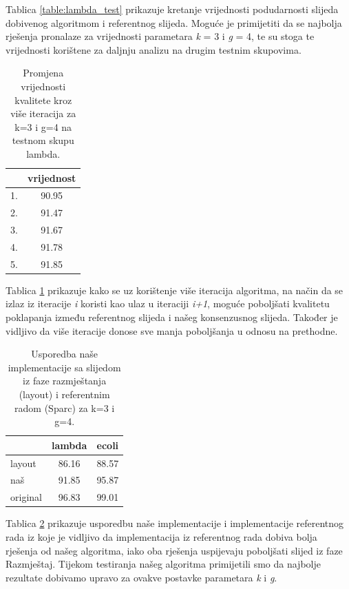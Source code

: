\documentclass[times, utf8, seminar, numeric]{fer}
\begin{document}
Tablica \ref{table:lambda_test} prikazuje kretanje vrijednosti podudarnosti slijeda dobivenog algoritmom i referentnog slijeda. Moguće je primijetiti da se najbolja rješenja pronalaze za vrijednosti parametara \emph{k} = 3 i \emph{g} = 4, te su stoga te vrijednosti korištene za daljnju analizu na drugim testnim skupovima.

\begin{table}[htb]
	\centering
	\begin{tabular}{l|c}
		& \multicolumn{1}{l}{vrijednost}\\ 	\hline
		1. 					& 90.95 	\\ 	\hline
		2.  				& 91.47 	\\	\hline
		3.		   			& 91.67		\\ 	\hline
		4.		   			& 91.78		\\ 	\hline
		5.		   			& 91.85		\\ 	\hline
	\end{tabular}
	\caption{Promjena vrijednosti kvalitete kroz više iteracija za k=3 i g=4 na testnom skupu lambda.}
	\label{table:iteracije}
\end{table}


Tablica \ref{table:iteracije} prikazuje kako se uz korištenje više iteracija algoritma, na način da se izlaz iz iteracije \emph{i} koristi kao ulaz u iteraciji \emph{i+1}, moguće poboljšati kvalitetu poklapanja između referentnog slijeda i našeg konsenzusnog slijeda. Također je vidljivo da više iteracije donose sve manja poboljšanja u odnosu na prethodne.

\begin{table}[htb]
	\centering
	\begin{tabular}{l|cc}
		& \multicolumn{1}{l}{lambda} & ecoli \\ 	\hline
		layout 					& 86.16 	& 88.57 \\ 	\hline
		naš  					& 91.85     & 95.87 \\	\hline
		original		   		& 96.83 	& 99.01 \\ 	\hline
	\end{tabular}
	\caption{Usporedba naše implementacije sa slijedom iz faze razmještanja (layout) i referentnim radom (Sparc) za k=3 i g=4.}
	\label{table:kvaliteta}
\end{table}

Tablica \ref{table:kvaliteta} prikazuje usporedbu naše implementacije i implementacije referentnog rada iz koje je vidljivo da implementacija iz referentnog rada dobiva bolja rješenja od našeg algoritma, iako oba rješenja uspijevaju poboljšati slijed iz faze Razmještaj.
Tijekom testiranja našeg algoritma primijetili smo da najbolje rezultate dobivamo upravo za ovakve postavke parametara \emph{k} i \emph{g}. 
\end{document}
